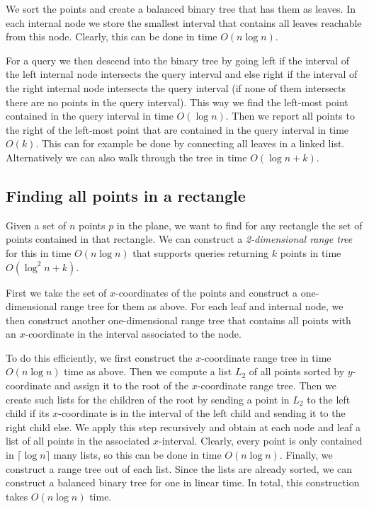 \documentclass[11pt, a4paper, twocolumn]{article}
\begin{document}
We sort the points and create a balanced binary tree that has them as leaves.
In each internal node we store the smallest interval that contains all leaves
reachable from this node. Clearly, this can be done in time $O(n \log n)$.

For a query we then descend into the binary tree by going left if the interval
of the left internal node intersects the query interval and else right if the 
interval of the right internal node intersects the query interval
(if none of them intersects there are no points in the query interval).
This way we find the left-most point contained in the query interval in time $O(\log n)$.
Then we report all points to the right of the left-most point that are contained in the
query interval in time $O(k)$. This can for example be done by connecting all leaves in 
a linked list. Alternatively we can also walk through the tree in time $O(\log n + k)$.

\subsection{Finding all points in a rectangle}

Given a set of $n$ points $p$ in the plane, we want to find for any rectangle the set
of points contained in that rectangle. We can construct a \textit{2-dimensional range tree}
for this in time $O(n \log n)$ that supports queries returning $k$ points in time $O(\log^2 n + k)$.

First we take the set of $x$-coordinates of the points and construct a one-dimensional range tree
for them as above. For each leaf and internal node, we then construct another one-dimensional range tree
that contains all points with an $x$-coordinate in the interval associated to the node.

To do this efficiently, we first construct the $x$-coordinate range tree in time $O(n \log n)$ time as above.
Then we compute a list $L_2$ of all points sorted by $y$-coordinate and assign it to the root of the
$x$-coordinate range tree. Then we create such lists for the children of the root by sending a point in $L_2$ to the
left child if its $x$-coordinate is in the interval of the left child and sending it to the right child else.
We apply this step recursively and obtain at each node and leaf a list of all points in the associated $x$-interval. Clearly, every point
is only contained in $\lceil\log n\rceil$ many lists, so this can be done in time $O(n \log n)$.
Finally, we construct a range tree out of each list. Since the lists are already sorted, we can
construct a balanced binary tree for one in linear time. In total, this construction takes $O(n \log n)$ time.
\end{document}
